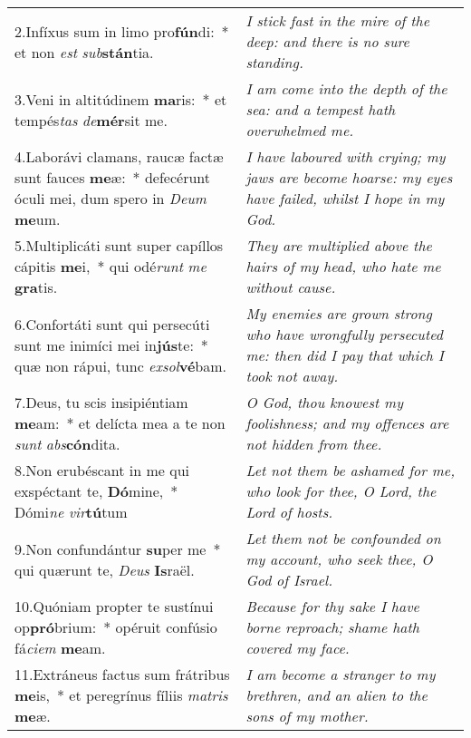 \begin{longtable}{@{\hskip0pt} p{10cm} | p{6cm} @{\hskip0pt}}
2.\enspace Infíxus sum in limo pro\textbf{fún}di:~* et non \textit{est} \textit{sub}\textbf{stán}tia.
 & \textit{\small I stick fast in the mire of the deep: and there is no sure standing.
}\\
3.\enspace Veni in altitúdinem \textbf{ma}ris:~* et tempés\textit{tas} \textit{de}\textbf{mér}sit me.
 & \textit{\small I am come into the depth of the sea: and a tempest hath overwhelmed me.
}\\
4.\enspace Laborávi clamans, raucæ factæ sunt fauces \textbf{me}æ:~* defecérunt óculi mei, dum spero in \textit{De}\textit{um} \textbf{me}um.
 & \textit{\small I have laboured with crying; my jaws are become hoarse: my eyes have failed, whilst I hope in my God.
}\\
5.\enspace Multiplicáti sunt super capíllos cápitis \textbf{me}i,~* qui odé\textit{runt} \textit{me} \textbf{gra}tis.
 & \textit{\small They are multiplied above the hairs of my head, who hate me without cause.
}\\
6.\enspace Confortáti sunt qui persecúti sunt me inimíci mei in\textbf{jús}te:~* quæ non rápui, tunc \textit{ex}\textit{sol}\textbf{vé}bam.
 & \textit{\small My enemies are grown strong who have wrongfully persecuted me: then did I pay that which I took not away.
}\\
7.\enspace Deus, tu scis insipiéntiam \textbf{me}am:~* et delícta mea a te non \textit{sunt} \textit{abs}\textbf{cón}dita.
 & \textit{\small O God, thou knowest my foolishness; and my offences are not hidden from thee.
}\\
8.\enspace Non erubéscant in me qui exspéctant te, \textbf{Dó}mine,~* Dómi\textit{ne} \textit{vir}\textbf{tú}tum
 & \textit{\small Let not them be ashamed for me, who look for thee, O Lord, the Lord of hosts.
}\\
9.\enspace Non confundántur \textbf{su}per me~* qui quærunt te, \textit{De}\textit{us} \textbf{Is}raël.
 & \textit{\small Let them not be confounded on my account, who seek thee, O God of Israel.
}\\
10.\enspace Quóniam propter te sustínui op\textbf{pró}brium:~* opéruit confúsio fá\textit{ci}\textit{em} \textbf{me}am.
 & \textit{\small Because for thy sake I have borne reproach; shame hath covered my face.
}\\
11.\enspace Extráneus factus sum frátribus \textbf{me}is,~* et peregrínus fíliis \textit{ma}\textit{tris} \textbf{me}æ.
 & \textit{\small I am become a stranger to my brethren, and an alien to the sons of my mother.
}
\end{longtable}

